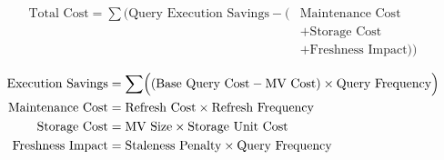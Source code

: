 
\begin{align}
\text{Total Cost} =\sum\big(\text{Query Execution Savings} - (&\text{Maintenance Cost} \nonumber \\
&+ \text{Storage Cost} \nonumber \\
&+ \text{Freshness Impact})\big)
\end{align}

\begin{align}
    \text{Execution Savings} &= \sum \Bigl( (\text{Base Query Cost} - \text{MV Cost}) \times \text{Query Frequency} \Bigr) \\
    \text{Maintenance Cost} &= \text{Refresh Cost} \times \text{Refresh Frequency} \\
    \text{Storage Cost} &= \text{MV Size} \times \text{Storage Unit Cost} \\
    \text{Freshness Impact} &= \text{Staleness Penalty} \times \text{Query Frequency}
\end{align}

